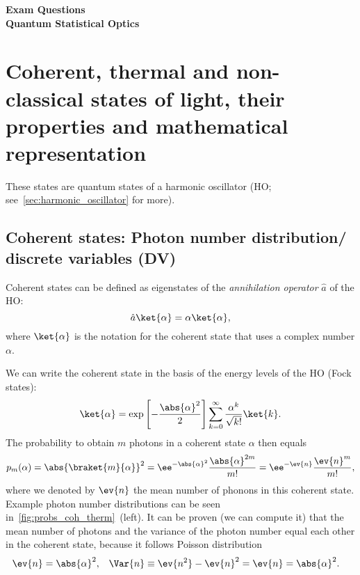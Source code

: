 \documentclass[fontsize=9pt]{scrartcl}
\begin{document}

  {
    \centering
    \textbf{\LARGE Exam Questions\\
      Quantum Statistical Optics
    }
    \par
  }

  \bigskip




\section{Coherent, thermal and non-classical states of light, their properties and mathematical representation}%

These states are quantum states of a harmonic oscillator (HO; see~\cref{sec:harmonic_oscillator} for more).

\subsection{Coherent states: Photon number distribution/ discrete variables (DV)} %
\label{sec:photon_number_distribution}

Coherent states can be defined as eigenstates of the \emph{annihilation operator} $\hat a$ of the HO:
\begin{equation}
  \label{eq:coh:ket:def}
  \hat a \ket{ \alpha } = \alpha \ket {\alpha },
\end{equation}
where $\ket{\alpha}$ is the notation for the coherent state that uses a complex number $\alpha$.

We can write the coherent state in the basis of the energy levels of the HO (Fock states):
\begin{equation}
  \ket{ \alpha } = \exp\left[- \frac{\abs{ \alpha }^2}{2} \right]
  \sum_{k=0}^\infty \frac{\alpha^k}{\sqrt{ k!}} \ket{k}.
\end{equation}
The probability to obtain $m$ photons in a coherent state $\alpha$ then equals
\begin{equation}
  p_m (\alpha) = \abs{ \braket{ m }{ \alpha }}^2
  = \ee^{ - \abs{ \alpha }^2 }
  \frac{ \abs{\alpha}^{2m} }{ m! }
  =
  \ee^{ - \ev{n} } \frac{ \ev{n }^m }{ m! },
\end{equation}
where we denoted by $\ev{n}$ the mean number of phonons in this coherent state.
Example photon number distributions can be seen in~\cref{fig:probs_coh_therm}~(left).
It can be proven (we can compute it) that the mean number of photons and the variance of the photon number equal each other in the coherent state, because it follows Poisson distribution
\begin{align}
  \ev{n} & = \abs{ \alpha }^2,
  &
  \Var {n} & \equiv \ev{ n^2 } - \ev{ n }^2 = \ev{n } = \abs{ \alpha }^2.
\end{align}
\end{document}
